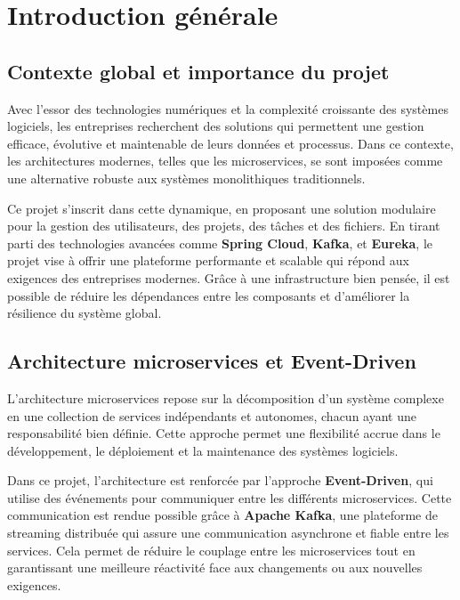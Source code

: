 \documentclass[12pt,a4paper]{report}
\begin{document}
\listoffigures
{}

\listoftables
{}

\tableofcontents

\chapter{Introduction générale}

\section*{Contexte global et importance du projet}

Avec l'essor des technologies numériques et la complexité croissante des systèmes logiciels, les entreprises recherchent des solutions qui permettent une gestion efficace, évolutive et maintenable de leurs données et processus. Dans ce contexte, les architectures modernes, telles que les microservices, se sont imposées comme une alternative robuste aux systèmes monolithiques traditionnels. 

Ce projet s'inscrit dans cette dynamique, en proposant une solution modulaire pour la gestion des utilisateurs, des projets, des tâches et des fichiers. En tirant parti des technologies avancées comme \textbf{Spring Cloud}, \textbf{Kafka}, et \textbf{Eureka}, le projet vise à offrir une plateforme performante et scalable qui répond aux exigences des entreprises modernes. Grâce à une infrastructure bien pensée, il est possible de réduire les dépendances entre les composants et d'améliorer la résilience du système global.

\section*{Architecture microservices et Event-Driven}
L'architecture microservices repose sur la décomposition d'un système complexe en une collection de services indépendants et autonomes, chacun ayant une responsabilité bien définie. Cette approche permet une flexibilité accrue dans le développement, le déploiement et la maintenance des systèmes logiciels.

Dans ce projet, l'architecture est renforcée par l'approche \textbf{Event-Driven}, qui utilise des événements pour communiquer entre les différents microservices. Cette communication est rendue possible grâce à \textbf{Apache Kafka}, une plateforme de streaming distribuée qui assure une communication asynchrone et fiable entre les services. Cela permet de réduire le couplage entre les microservices tout en garantissant une meilleure réactivité face aux changements ou aux nouvelles exigences.
\end{document}
